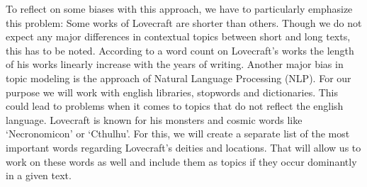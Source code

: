To reflect on some biases with this approach, we have to particularly emphasize this 
problem: Some works of Lovecraft are shorter than others. Though we do not expect any 
major differences in contextual topics between short and long texts, this has to be 
noted. According to a word count on Lovecraft’s works the length of his works linearly 
increase with the years of writing. Another major bias in topic modeling is the approach 
of Natural Language Processing (NLP). For our purpose we will work with english libraries, 
stopwords and dictionaries. This could lead to problems when it comes to topics that do 
not reflect the english language. Lovecraft is known for his monsters and cosmic words 
like ‘Necronomicon’ or ‘Cthulhu’. For this, we will create a separate list of the most 
important words regarding Lovecraft’s deities and locations. That will allow us to work 
on these words as well and include them as topics if they occur dominantly in a given text.